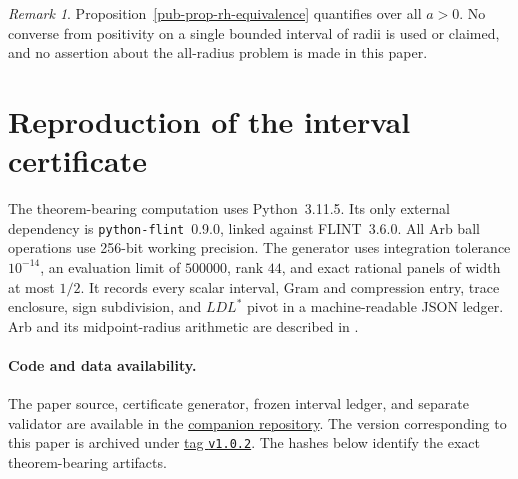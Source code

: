 \documentclass[11pt]{article}
\theoremstyle{remark}
\newtheorem{remark}[theorem]{Remark}
\begin{document}
\begin{remark}
Proposition~\ref{pub-prop-rh-equivalence} quantifies over all \(a>0\).
No converse from positivity on a single bounded interval of radii is used or
claimed, and no assertion about the all-radius problem is made in this paper.
\end{remark}

\appendix

\section{Reproduction of the interval certificate}
\label{pub-sec-reproduction}

The theorem-bearing computation uses Python~3.11.5.
Its only external dependency is \texttt{python-flint}~0.9.0, linked against FLINT~3.6.0.
All Arb ball operations use 256-bit working precision.
The generator uses integration tolerance \(10^{-14}\), an evaluation limit of \(500000\),
rank \(44\), and exact rational panels of width at most \(1/2\).
It records every scalar interval, Gram and compression entry, trace enclosure,
sign subdivision, and \(LDL^*\) pivot in a machine-readable JSON ledger.
Arb and its midpoint-radius arithmetic are described in \cite{Johansson2017Arb}.

\paragraph{Code and data availability.}
The paper source, certificate generator, frozen interval ledger,
and separate validator are available in the \href{https://github.com/sharantresearch-ops/certified-local-weil-positivity}{companion repository}.
The version corresponding to this paper is archived under \href{https://github.com/sharantresearch-ops/certified-local-weil-positivity/tree/v1.0.2}{tag \texttt{v1.0.2}}.
The hashes below identify the exact theorem-bearing artifacts.
\end{document}
